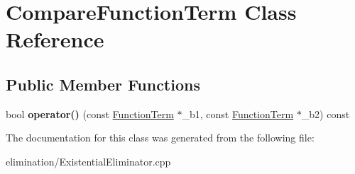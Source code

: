 \hypertarget{classCompareFunctionTerm}{\section{\-Compare\-Function\-Term \-Class \-Reference}
\label{classCompareFunctionTerm}
}
\subsection*{\-Public \-Member \-Functions}
\begin{DoxyCompactItemize}
\item 
\hypertarget{classCompareFunctionTerm_a7257b26b42314f59d775a01d55037b3f}{bool {\bfseries operator()} (const \hyperlink{classFunctionTerm}{\-Function\-Term} $\ast$\-\_\-b1, const \hyperlink{classFunctionTerm}{\-Function\-Term} $\ast$\-\_\-b2) const }\label{classCompareFunctionTerm_a7257b26b42314f59d775a01d55037b3f}

\end{DoxyCompactItemize}


\-The documentation for this class was generated from the following file\-:\begin{DoxyCompactItemize}
\item 
elimination/\-Existential\-Eliminator.\-cpp\end{DoxyCompactItemize}
